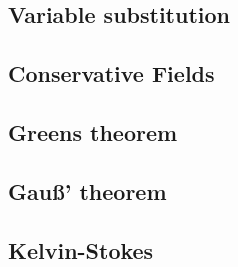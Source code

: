 \documentclass{article}
\theoremstyle{plain}
\begin{document}
\subsection{Variable substitution}

\subsection{Conservative Fields}

\subsection{Greens theorem}

\subsection{Gau{\ss}' theorem}

\subsection{Kelvin-Stokes}
\end{document}
